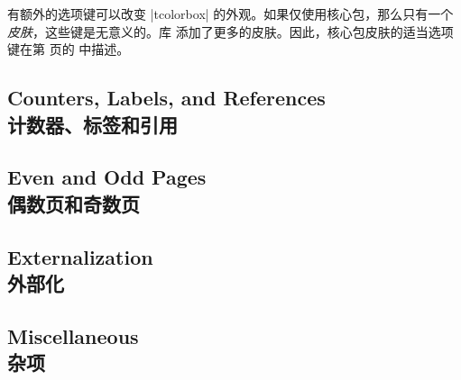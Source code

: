 有额外的选项键可以改变 |tcolorbox| 的外观。如果仅使用核心包，那么只有一个\emph{皮肤}，这些键是无意义的。库  添加了更多的皮肤。因此，核心包皮肤的适当选项键在第 \pageref{sec:skincorekeys} 页的  中描述。

\subsection{Counters, Labels, and References\\计数器、标签和引用}%

\subsection{Even and Odd Pages\\偶数页和奇数页}


\subsection{Externalization\\外部化}

\subsection{Miscellaneous\\杂项}


